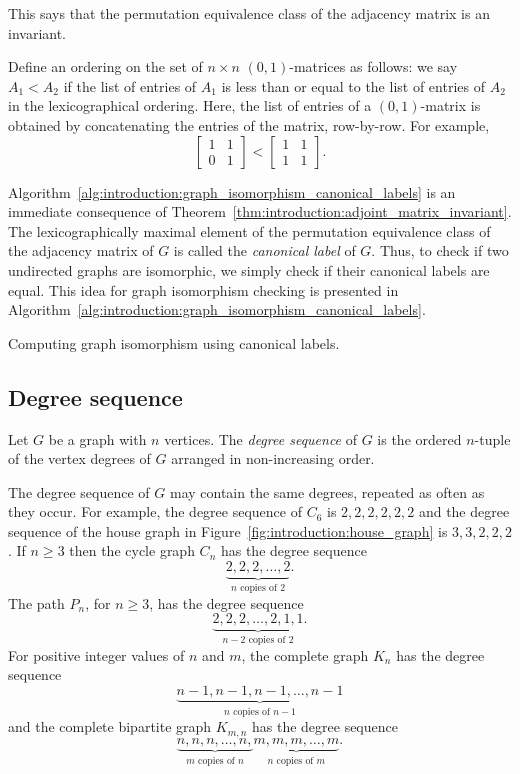 This says that the permutation equivalence class of the adjacency
matrix is an invariant.

Define an ordering on the set of $n \times n$ $(0, 1)$-matrices as
follows: we say $A_1 < A_2$ if the list of entries of $A_1$ is less
than or equal to the list of entries of $A_2$ in the lexicographical
ordering. Here, the list of entries of a $(0, 1)$-matrix is obtained
by concatenating the entries of the matrix, row-by-row. For example,
\[
\begin{bmatrix}
1 & 1 \\
0 & 1
\end{bmatrix}
<
\begin{bmatrix}
1 & 1 \\
1 & 1
\end{bmatrix}.
\]

Algorithm~\ref{alg:introduction:graph_isomorphism_canonical_labels} is
an immediate consequence of
Theorem~\ref{thm:introduction:adjoint_matrix_invariant}. The
lexicographically maximal element of the permutation equivalence class
of the adjacency matrix of $G$ is called the \emph{canonical label} of
$G$. Thus, to check if two undirected graphs are isomorphic, we simply
check if their canonical labels are equal. This idea for graph
isomorphism checking is presented in
Algorithm~\ref{alg:introduction:graph_isomorphism_canonical_labels}.

\begin{algorithm}[!htpb]

\caption{Computing graph isomorphism using canonical labels.}
\label{alg:introduction:graph_isomorphism_canonical_labels}
\end{algorithm}



\subsection{Degree sequence}

Let $G$ be a graph with $n$ vertices. The \emph{degree sequence} of
$G$ is the ordered $n$-tuple of the vertex degrees of $G$ arranged in
non-increasing order.

The degree sequence of $G$ may contain the same degrees, repeated as
often as they occur. For example, the degree sequence of $C_6$ is
$2, 2, 2, 2, 2, 2$ and the degree sequence of the house graph in
Figure~\ref{fig:introduction:house_graph} is $3, 3, 2, 2, 2$. If
$n \geq 3$ then the cycle graph $C_n$ has the degree sequence
\[
\underbrace{2, 2, 2, \dots, 2}_{n \text{ copies of } 2}.
\]
The path $P_n$, for $n \geq 3$, has the degree sequence
\[
\underbrace{2, 2, 2, \dots, 2, 1, 1}_{n - 2 \text{ copies of } 2}.
\]
For positive integer values of $n$ and $m$, the complete graph $K_n$
has the degree sequence
\[
\underbrace{n-1, n-1, n-1, \dots, n-1}_{n \text{ copies of } n-1}
\]
and the complete bipartite graph $K_{m,n}$ has the degree sequence
\[
\underbrace{n, n, n, \dots, n,}_{m \text{ copies of } n}
\underbrace{m, m, m, \dots, m}_{n \text{ copies of } m}.
\]

